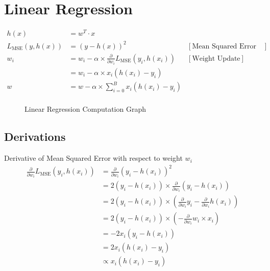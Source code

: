 \section{Linear Regression}

\begin{align*}
    h(x) &= w^T \cdot x &\\ 
    L_{\text{MSE}}(y, h(x)) &= (y-h(x))^2 & [\text{Mean Squared Error Loss}]\\
    w_i &= w_i - \alpha \times \frac{\partial}{\partial w_i} L_{\text{MSE}}(y_i, h(x_i)) & [\text{Weight Update}]\\
    &= w_i - \alpha \times x_i(h(x_i) - y_i)\\
    w &= w -\alpha \times \sum^{B}_{i=0} x_i(h(x_i) - y_i)\\
\end{align*}

\begin{figure}[h]
    \centering
    \caption{Linear Regression Computation Graph}
\end{figure}

\subsection{Derivations}
Derivative of Mean Squared Error with respect to weight $w_i$\\

\begin{align*}
    \frac{\partial}{\partial w_i} L_{\text{MSE}}(y_i, h(x_i)) &= \frac{\partial}{\partial w_i} (y_i - h(x_i))^2\\
    &= 2(y_i - h(x_i)) \times \frac{\partial}{\partial w_i} (y_i - h(x_i))\\
    &= 2(y_i - h(x_i)) \times \left(\frac{\partial}{\partial w_i} y_i - \frac{\partial}{\partial w_i}h(x_i)\right)\\
    &= 2(y_i - h(x_i)) \times \left(-\frac{\partial}{\partial w_i}w_i \times x_i\right)\\
    &= -2x_i(y_i - h(x_i))\\
    &= 2x_i(h(x_i)-y_i)\\
    &\propto x_i(h(x_i)-y_i)\\
\end{align*}
